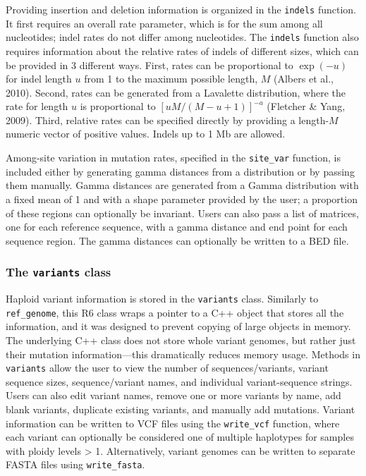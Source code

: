 \documentclass[12pt,]{article}
\begin{document}
Providing insertion and deletion information is organized in the \texttt{indels} function.
It first requires an overall rate parameter, which is for the sum among all
nucleotides; indel rates do not differ among nucleotides.
The \texttt{indels} function also requires information about the relative rates of
indels of different sizes, which can be provided in 3 different ways.
First, rates can be proportional to \(\exp(-u)\) for indel length \(u\) from
1 to the maximum possible length, \(M\) (Albers et al., 2010).
Second, rates can be generated from a Lavalette distribution,
where the rate for length \(u\) is proportional to
\(\left[{u M / (M - u + 1)}\right]^{-a}\) (Fletcher \& Yang, 2009).
Third, relative rates can be specified directly by providing a length-\(M\)
numeric vector of positive values.
Indels up to 1 Mb are allowed.

Among-site variation in mutation rates, specified in the \texttt{site\_var} function,
is included either by generating gamma distances from a distribution
or by passing them manually.
Gamma distances are generated from a Gamma distribution with a fixed mean of 1
and with a shape parameter provided by the user;
a proportion of these regions can optionally be invariant.
Users can also pass a list of matrices, one for each reference sequence,
with a gamma distance and end point for each sequence region.
The gamma distances can optionally be written to a BED file.

\hypertarget{the-variants-class}{%
\subsubsection{\texorpdfstring{The \texttt{variants} class}{The variants class}}\label{the-variants-class}}

Haploid variant information is stored in the \texttt{variants} class.
Similarly to \texttt{ref\_genome}, this R6 class wraps a pointer to a C++ object
that stores all the information, and it was designed to prevent copying of large
objects in memory.
The underlying C++ class does not store whole variant genomes, but
rather just their mutation information---this dramatically reduces memory usage.
Methods in \texttt{variants} allow the user to view the number of sequences/variants,
variant sequence sizes, sequence/variant names, and individual variant-sequence strings.
Users can also edit variant names, remove one or more variants by name,
add blank variants, duplicate existing variants,
and manually add mutations.
Variant information can be written to VCF files using the \texttt{write\_vcf} function,
where each variant can optionally be considered one of multiple haplotypes for
samples with ploidy levels \textgreater{} 1.
Alternatively, variant genomes can be written to separate FASTA files
using \texttt{write\_fasta}.
\end{document}
